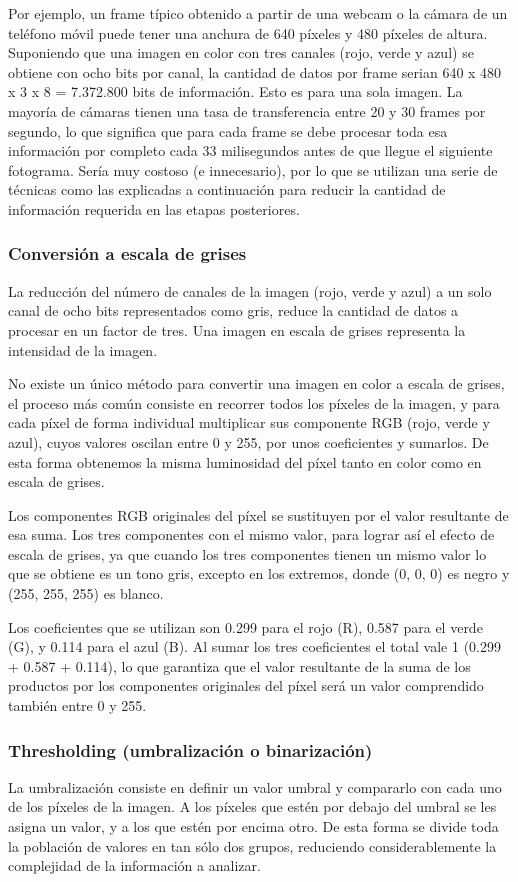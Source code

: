 Por ejemplo, un frame típico obtenido a partir de una webcam o la cámara de un teléfono móvil puede tener una anchura de 640 píxeles y 480 píxeles de altura. Suponiendo que una imagen en color con tres canales (rojo, verde y azul) se obtiene con ocho bits por canal, la cantidad de datos por frame serian 640 x 480 x 3 x 8 = 7.372.800 bits de información. Esto es para una sola imagen. La mayoría de cámaras tienen una tasa de transferencia entre 20 y 30 frames por segundo, lo que significa que para cada frame se debe procesar toda esa información por completo cada 33 milisegundos antes de que llegue el siguiente fotograma. Sería muy costoso (e innecesario), por lo que se utilizan una serie de técnicas como las explicadas a continuación para reducir la cantidad de información requerida en las etapas posteriores.

\subsubsection{Conversión a escala de grises}
La reducción del número de canales de la imagen (rojo, verde y azul) a un solo canal de ocho bits representados como gris, reduce la cantidad de datos a procesar en un factor de tres. Una imagen en escala de grises representa la intensidad de la imagen. 

No existe un único método para convertir una imagen en color a escala de grises, el proceso más común consiste en recorrer todos los píxeles de la imagen, y para cada píxel de forma individual multiplicar sus componente RGB (rojo, verde y azul), cuyos valores oscilan entre 0 y 255, por unos coeficientes y sumarlos. De esta forma obtenemos la misma luminosidad del píxel tanto en color como en escala de grises.

Los componentes RGB originales del píxel se sustituyen por el valor resultante de esa suma. Los tres componentes con el mismo valor, para lograr así el efecto de escala de grises, ya que cuando los tres componentes tienen un mismo valor lo que se obtiene es un tono gris, excepto en los extremos, donde (0, 0, 0) es negro y (255, 255, 255) es blanco.

Los coeficientes que se utilizan son 0.299 para el rojo (R), 0.587 para el verde (G), y 0.114 para el azul (B). Al sumar los tres coeficientes el total vale 1 (0.299 + 0.587 + 0.114), lo que garantiza que el valor resultante de la suma de los productos por los componentes originales del píxel será un valor comprendido también entre 0 y 255.

\subsubsection{Thresholding (umbralización o binarización)}
La umbralización consiste en definir un valor umbral y compararlo con cada uno de los píxeles de la imagen. A los píxeles que estén por debajo del umbral se les asigna un valor, y a los que estén por encima otro. De esta forma se divide toda la población de valores en tan sólo dos grupos, reduciendo considerablemente la complejidad de la información a analizar.

